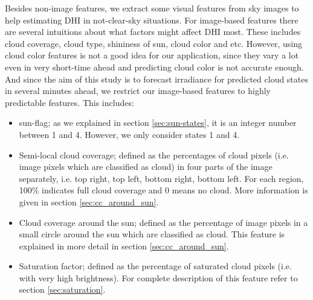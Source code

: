 Besides non-image features, we extract some visual features from sky images to help estimating DHI in not-clear-sky situations. For image-based features there are several intuitions about what factors might affect DHI most. These includes cloud coverage, cloud type, shininess of sun, cloud color and etc. However, using cloud color features is not a good idea for our application, since they vary a lot even in very short-time ahead and predicting cloud color is not accurate enough. And since the aim of this study is to forecast irradiance for predicted cloud states in several minutes ahead, we restrict our image-based features to highly predictable features. This includes:
\begin{itemize}
\item sun-flag; as we explained in section \ref{sec:sun-states}, it is an integer number between 1 and 4. However, we only consider states 1 and 4. 
\item Semi-local cloud coverage; defined as the percentages of cloud pixels (i.e. image pixels which are classified as cloud) in four parts of the image separately, i.e. top right, top left, bottom right, bottom left. For each region, 100\% indicates full cloud coverage and 0 means no cloud. More information is given in section \ref{sec:cc_around_sun}.
\item Cloud coverage around the sun; defined as the percentage of image pixels in a small circle around the sun which are classified as cloud. This feature is explained in more detail in section \ref{sec:cc_around_sun}.
\item Saturation factor; defined as the percentage of saturated cloud pixels (i.e. with very high brightness). For complete description of this feature refer to section \ref{sec:saturation}.
\end{itemize}

